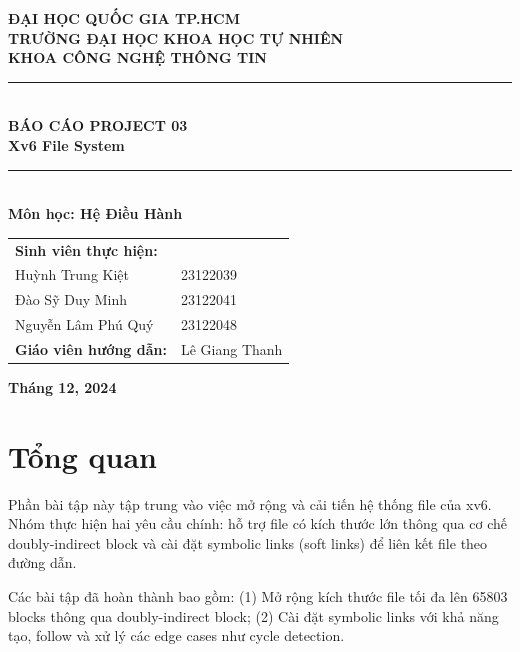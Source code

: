 \documentclass[12pt,a4paper]{article}
\begin{document}
\begin{titlepage}
    \centering
    \vspace*{1cm}
    
    \textbf{\large ĐẠI HỌC QUỐC GIA TP.HCM}\\[0.3cm]
    \textbf{\large TRƯỜNG ĐẠI HỌC KHOA HỌC TỰ NHIÊN}\\[0.3cm]
    \textbf{\large KHOA CÔNG NGHỆ THÔNG TIN}\\[2cm]
    
    \rule{\linewidth}{0.5mm}\\[0.5cm]
    {\LARGE \textbf{BÁO CÁO PROJECT 03}}\\[0.3cm]
    {\Large \textbf{Xv6 File System}}\\[0.3cm]
    \rule{\linewidth}{0.5mm}\\[1.5cm]
    
    \textbf{\large Môn học: Hệ Điều Hành}\\[2cm]
    
    \begin{tabular}{ll}
        \textbf{Sinh viên thực hiện:} & \\[0.3cm]
        Huỳnh Trung Kiệt & 23122039 \\
        Đào Sỹ Duy Minh & 23122041 \\
        Nguyễn Lâm Phú Quý & 23122048 \\[1cm]
        \textbf{Giáo viên hướng dẫn:} & Lê Giang Thanh \\
    \end{tabular}
    
    \vfill
    \textbf{Tháng 12, 2024}
\end{titlepage}

\tableofcontents
\newpage

\section{Tổng quan}

Phần bài tập này tập trung vào việc mở rộng và cải tiến hệ thống file của xv6. Nhóm thực hiện hai yêu cầu chính: hỗ trợ file có kích thước lớn thông qua cơ chế doubly-indirect block và cài đặt symbolic links (soft links) để liên kết file theo đường dẫn.

Các bài tập đã hoàn thành bao gồm: (1) Mở rộng kích thước file tối đa lên 65803 blocks thông qua doubly-indirect block; (2) Cài đặt symbolic links với khả năng tạo, follow và xử lý các edge cases như cycle detection.
\end{document}
